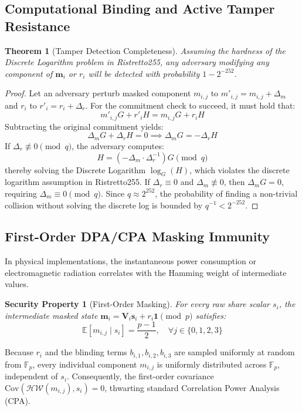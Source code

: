 \documentclass[10pt,journal,compsoc]{IEEEtran}
\newtheorem{theorem}{Theorem}
\newtheorem{securityproperty}{Security Property}
\begin{document}
\subsection{Computational Binding and Active Tamper Resistance}
\begin{theorem}[Tamper Detection Completeness]
Assuming the hardness of the Discrete Logarithm problem in Ristretto255, any adversary modifying any component of $\mathbf{m}_i$ or $r_i$ will be detected with probability $1 - 2^{-252}$.
\end{theorem}
\begin{proof}
Let an adversary perturb masked component $m_{i, j}$ to $m'_{i, j} = m_{i, j} + \Delta_m$ and $r_i$ to $r'_i = r_i + \Delta_r$. For the commitment check to succeed, it must hold that:
\begin{equation}
m'_{i, j} G + r'_i H = m_{i, j} G + r_i H
\end{equation}
Subtracting the original commitment yields:
\begin{equation}
\Delta_m G + \Delta_r H = 0 \implies \Delta_m G = -\Delta_r H
\end{equation}
If $\Delta_r \not\equiv 0 \pmod q$, the adversary computes:
\begin{equation}
H = (-\Delta_m \cdot \Delta_r^{-1}) G \pmod q
\end{equation}
thereby solving the Discrete Logarithm $\log_G(H)$, which violates the discrete logarithm assumption in Ristretto255. If $\Delta_r \equiv 0$ and $\Delta_m \not\equiv 0$, then $\Delta_m G = 0$, requiring $\Delta_m \equiv 0 \pmod q$. Since $q \approx 2^{252}$, the probability of finding a non-trivial collision without solving the discrete log is bounded by $q^{-1} < 2^{-252}$.
\end{proof}

\subsection{First-Order DPA/CPA Masking Immunity}
In physical implementations, the instantaneous power consumption or electromagnetic radiation correlates with the Hamming weight of intermediate values.
\begin{securityproperty}[First-Order Masking]
For every raw share scalar $s_i$, the intermediate masked state $\mathbf{m}_i = \mathbf{V}_i \mathbf{s}_i + r_i \mathbf{1} \pmod p$ satisfies:
\begin{equation}
\mathbb{E}[m_{i, j} \mid s_i] = \frac{p-1}{2}, \quad \forall j \in \{0, 1, 2, 3\}
\end{equation}
\end{securityproperty}
Because $r_i$ and the blinding terms $b_{i, 1}, b_{i, 2}, b_{i, 3}$ are sampled uniformly at random from $\mathbb{F}_p$, every individual component $m_{i, j}$ is uniformly distributed across $\mathbb{F}_p$, independent of $s_i$. Consequently, the first-order covariance $\text{Cov}(\mathcal{HW}(m_{i, j}), s_i) = 0$, thwarting standard Correlation Power Analysis (CPA).
\end{document}
